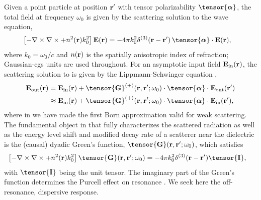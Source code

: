 \documentclass[preprint,aps,pra,onecolumn]{revtex4-1} %
\newcommand{\inp}{{\rm in}}
\newcommand{\out}{{\rm out}}
\newcommand{\unittens}{\tensor{\mathbf{I}}}
\begin{document}
Given a point particle at position $\mathbf{r}'$ with tensor polarizability $\tensor{\boldsymbol{\alpha}}$, the total field  at frequency $\omega_0$ is given by the scattering solution to the wave equation, 
	\begin{align}\label{Eq::WaveEquationSource}
		\left[ - \nabla \times\nabla \times + n^2(\br)k_0^2 \right] \mathbf{E}(\br) &= -4\pi  k_0^2 \delta^{(3)}(\br-\br')\,  \tensor{\boldsymbol{\alpha}}\cdot \mathbf{E}(\br),
	\end{align}
where $k_0=\omega_0/c$ and $n(\mathbf{r})$ is the spatially anisotropic index of refraction; Gaussian-cgs units are used throughout.  For an asymptotic input field $\mathbf{E}_{\inp}(\br)$, the scattering solution to  is given by the Lippmann-Schwinger equation \cite{wubs_multiple-scattering_2004},
	\begin{align}
		\mathbf{E}_{\out}(\br) &=\mathbf{E}_{\inp}(\br)+\tensor{\mathbf{G}}^{(+)}(\br , \br'; \omega_0)\cdot 
\tensor{\boldsymbol{\alpha}}\cdot \mathbf{E}_{\out}(\br')\\
		&\approx \mathbf{E}_{\inp}(\br)+ \tensor{\mathbf{G}}^{(+)}(\br , \br'; \omega_0) \cdot 
\tensor{\boldsymbol{\alpha}}\cdot \mathbf{E}_{\inp}(\br'), \label{Eq::ScatteredField}
	\end{align}
where in  we have made the first Born approximation valid for weak scattering. The fundamental object in that fully characterizes the scattered radiation as well as the energy level shift and modified decay rate of a scatterer near the dielectric is the (causal) dyadic Green's function, $\tensor{\mathbf{G}}(\br, \br';\omega_0)$, which satisfies
	\begin{align} \label{Eq::GreensDiffEq}
		\left[ -\nabla\times\nabla\times + n^2(\mbf{r}) k_0^2 \right] \tensor{\mathbf{G}}(\br, \br';\omega_0) &= -4\pi 
k_0^2 \delta^{(3)}(\mathbf{r}-\mathbf{r}') \unittens,
	\end{align}
with $\unittens$ being the unit tensor.  The imaginary part of the Green's function determines the Purcell effect on resonance \cite{}.  We seek here the off-resonance, dispersive response.  
\end{document}
